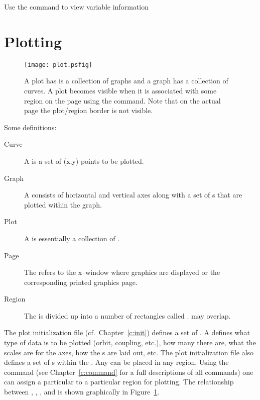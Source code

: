 Use the  command to view variable information

\vfill
\break
\section{Plotting}

\begin{figure}
  \centering
  \texttt{[image: plot.psfig]}
  \caption{A plot has is a collection of graphs and a graph has a 
collection of curves. A plot becomes visible when it is associated
with some region on the page using the  command. Note that
on the actual page the plot/region border is not visible.}
  \label{f:plot}
\end{figure}

Some definitions:
  \vspace*{-3ex}
\begin{description}
\item[Curve] \Newline
A  is a set of (x,y) points to be plotted.
\item[Graph] \Newline
A  consists of horizontal and vertical axes along with a set
of s that are plotted within the graph. 
\item[Plot] \Newline
A  is essentially a collection of .
\item[Page] \Newline
The  refers to the x--window where graphics are displayed or the 
corresponding printed graphics page.
\item[Region] \Newline
The  is divided up into a number of rectangles called
.  may overlap.
\end{description}

The plot initialization file (cf.~Chapter~\ref{c:init}) defines a set
of . A  defines what type of data is
to be plotted (orbit, coupling, etc.), how many  there are,
what the scales are for the  axes, how the s are
laid out, etc.  The plot initialization file also defines a set of
s within the . Any  can be placed in any region.
 Using the  command  
(see Chapter~\ref{c:command} for a full descriptions of all commands) one
can assign a particular  to a particular region for plotting.
The relationship between , , , and
 is shown graphically in Figure~\ref{f:plot}.

